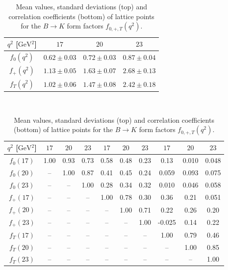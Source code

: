 \documentclass[twocolumn,epjc3]{svjour3}
\numberwithin{equation}{section}
\newcommand{\checked}[1]{{\color{brown}{ {\bf Checked: }{#1}}}}
\renewcommand{\checked}[1]{#1}
\renewcommand{\[}{\big[}
\renewcommand{\]}{\big]}
\renewcommand{\(}{\big(}
\renewcommand{\)}{\big)}
\newcommand{\GeV}{\ensuremath{\mathrm{GeV}}}
\begin{document}
\begin{table}
  \begin{center}
    \renewcommand{\arraystretch}{1.3}
    \begin{tabular}{cccc}
        \hline
        $q^2$ [\GeV$^2$] & $17$            & $20$            & $23$\\
        \hline
        $f_0(q^2)$   & $0.62 \pm 0.03$ & $0.72 \pm 0.03$ & $0.87 \pm 0.04$\\
        $f_+(q^2)$   & $1.13 \pm 0.05$ & $1.63 \pm 0.07$ & $2.68 \pm 0.13$\\
        $f_T(q^2)$   & $1.02 \pm 0.06$ & $1.47 \pm 0.08$ & $2.42 \pm 0.18$\\
        \hline
    \end{tabular}\\
    \renewcommand{\arraystretch}{1.0}
    \vspace{2\smallskipamount}
    \renewcommand{\arraystretch}{1.3}
    \begin{tabular}{cccccccccc}
        \hline
        $q^2$ [\GeV$^2$]
             & $17$  & $20$ & $23$ & $17$ & $20$ & $23$ & $17$  & $20$   & $23$ \\
        \hline
   $f_0(17)$ & 1.00  & 0.93 & 0.73 & 0.58 & 0.48 & 0.23 & 0.13  & 0.010 & 0.048 \\
   $f_0(20)$ & --    & 1.00 & 0.87 & 0.41 & 0.45 & 0.24 & 0.059 & 0.093 & 0.075 \\
   $f_0(23)$ & --    & --   & 1.00 & 0.28 & 0.34 & 0.32 & 0.010 & 0.046 & 0.058 \\
   $f_+(17)$ & --    & --   & --   & 1.00 & 0.78 & 0.30 & 0.36  & 0.21  & 0.051 \\
   $f_+(20)$ & --    & --   & --   & --   & 1.00 & 0.71 & 0.22  & 0.26  & 0.20  \\
   $f_+(23)$ & --    & --   & --   & --   & --   & 1.00 &-0.025 & 0.14  & 0.22  \\
   $f_T(17)$ & --    & --   & --   & --   & --   & --   & 1.00  & 0.79  & 0.46  \\
   $f_T(20)$ & --    & --   & --   & --   & --   & --   & --    & 1.00  & 0.85  \\
   $f_T(23)$ & --    & --   & --   & --   & --   & --   & --    & --    & 1.00  \\
        \hline
    \end{tabular}

  \end{center}

    \renewcommand{\arraystretch}{1.0}
    \caption{Mean values, standard deviations (top) and correlation
        coefficients (bottom) of lattice points \cite{Bouchard:2013eph} for the
        $B\to K$ form factors $f_{0,+,T}(q^2)$. \checked{}
        \label{tab:btok-lattice}
      }
\end{table}
\end{document}
